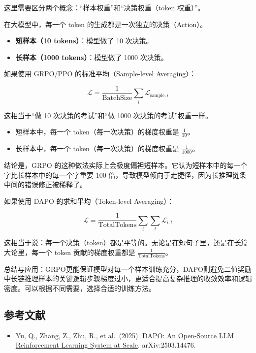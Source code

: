这里需要区分两个概念：``样本权重''和``决策权重（token 权重）''。

在大模型中，每一个 token 的生成都是一次独立的决策（Action）。

\begin{itemize}
\tightlist
\item
  \textbf{短样本（10 tokens）}：模型做了 10 次决策。
\item
  \textbf{长样本（1000 tokens）}：模型做了 1000 次决策。
\end{itemize}

如果使用 GRPO/PPO 的标准平均（Sample-level Averaging）：

\[
\mathcal{L}
=
\frac{1}{\mathrm{BatchSize}}
\sum_i \mathcal{L}_{\mathrm{sample},i}
\]

这相当于``做 10 次决策的考试''和``做 1000 次决策的考试''权重一样。

\begin{itemize}
\tightlist
\item
  短样本中，每一个 token（每一次决策）的梯度权重是 \(\frac{1}{10}\)。
\item
  长样本中，每一个 token（每一次决策）的梯度权重是 \(\frac{1}{1000}\)。
\end{itemize}

结论是，GRPO 的这种做法实际上会极度偏袒短样本。它认为短样本中的每一个字比长样本中的每一个字重要 100 倍，导致模型倾向于走捷径，因为长推理链条中间的错误修正被稀释了。

如果使用 DAPO 的求和平均（Token-level Averaging）：

\[
\mathcal{L}
=
\frac{1}{\mathrm{TotalTokens}}
\sum_i \sum_t \mathcal{L}_{i,t}
\]

这相当于说：每一个决策（token）都是平等的。无论是在短句子里，还是在长篇大论里，每一个 token 贡献的梯度权重都是 \(\frac{1}{\mathrm{TotalTokens}}\)。

总结与应用：GRPO更能保证模型对每一个样本训练充分，DAPO则避免二值奖励中长链推理样本的关键逻辑步骤梯度过小，更适合提高复杂推理的收敛效率和逻辑密度。可以根据不同需要，选择合适的训练方法。

\hypertarget{ux53c2ux8003ux6587ux732e-109}{%
\subsection{参考文献}\label{ux53c2ux8003ux6587ux732e-109}}

\vspace{0.25em}
\begin{itemize}
\tightlist
\item
  Yu, Q., Zhang, Z., Zhu, R., et al.~(2025). \href{https://arxiv.org/abs/2503.14476}{DAPO: An Open-Source LLM Reinforcement Learning System at Scale}. arXiv:2503.14476.
\end{itemize}

